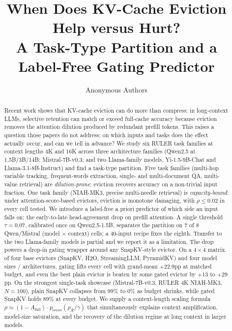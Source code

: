 \documentclass{article} %
\title{When Does KV-Cache Eviction Help versus Hurt?\\
A Task-Type Partition and a Label-Free Gating Predictor}
\author{%
  Anonymous Authors%
}
\begin{document}
\maketitle

\begin{abstract}
Recent work shows that KV-cache eviction can do more than compress: in long-context
LLMs, selective retention can match or exceed full-cache accuracy because eviction
removes the attention dilution produced by redundant prefill tokens. This raises a
question those papers do not address: on which inputs and tasks does the effect
actually occur, and can we tell in advance? We study six RULER task families at
context lengths 4K and 16K across three architecture families (Qwen2.5 at
1.5B/3B/14B; Mistral-7B-v0.3; and two Llama-family models, Yi-1.5-9B-Chat and
Llama-3.1-8B-Instruct) and find a task-type partition. Five task families
(multi-hop variable tracking, frequent-words extraction, single- and
multi-document QA, multi-value retrieval) are \emph{dilution-prone}: eviction
recovers accuracy on a non-trivial input fraction. One task family (NIAH-MK3,
precise multi-needle retrieval) is \emph{capacity-bound}: under
attention-score-based evictors, eviction is monotone damaging, with $\rho \le
0.02$ in every cell tested. We introduce a label-free a priori predictor of which
side an input falls on: the early-to-late head-agreement drop on prefill attention.
A single threshold $\tau = 0.07$, calibrated once on Qwen2.5-1.5B, separates the
partition on $7$ of $8$ Qwen/Mistral (model $\times$ context) cells; a
$40$-input recipe fixes the eighth. Transfer to the two Llama-family models is
partial and we report it as a limitation. The drop powers a drop-in gating wrapper
around any SnapKV-style evictor. On a $4 \times 4$ matrix of four base evictors
(SnapKV, H2O, StreamingLLM, PyramidKV) and four model sizes / architectures, gating
lifts every cell with grand-mean $+22.9$pp at matched budget, and even the
best plain evictor is beaten by some gated evictor by $+13$ to $+29$pp. On the
strongest single-task showcase (Mistral-7B-v0.3, RULER 4K NIAH-MK3, $N=100$),
plain SnapKV collapses from $99\%$ to $0\%$ as budget shrinks, while gated SnapKV
holds $89\%$ at every budget. We supply a context-length scaling formula
$\rho \approx (1 - A_{\mathrm{full}}) \cdot p_{\mathrm{recov}}(\rho_{\mathcal R} / \gamma)$
that simultaneously explains context amplification, model-size saturation, and
the recovery of the dilution regime at long context in larger models.
\end{abstract}
\end{document}
